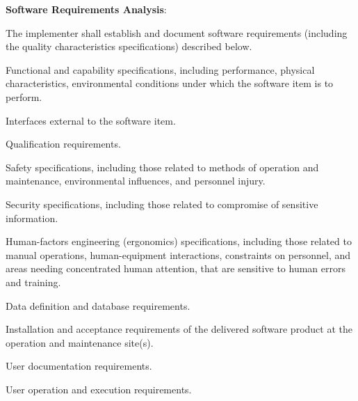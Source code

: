 			\begin{adjustwidth}{2em}{0pt} 

				\begin{compactenum}

					\item {\bf Software Requirements Analysis}:

					\begin{compactenum}

						\item The implementer shall establish and document software requirements (including the quality characteristics specifications) described below.

						\begin{compactenum}

							\item Functional and capability specifications, including performance, physical characteristics, environmental conditions under which the software item is to perform.

							\item Interfaces external to the software item.

							\item Qualification requirements.

							\item Safety specifications, including those related to methods of operation and maintenance, environmental influences, and personnel injury.

							\item Security specifications, including those related to compromise of sensitive information.

							\item Human-factors engineering (ergonomics) specifications, including those related to manual operations, human-equipment interactions, constraints on personnel, and areas needing concentrated human attention, that are sensitive to human errors and training.

							\item Data definition and database requirements.

							\item Installation and acceptance requirements of the delivered software product at the operation and maintenance site(s).

							\item User documentation requirements.

							\item User operation and execution requirements.


\end{compactenum}
\end{compactenum}
\end{compactenum}
\end{adjustwidth}

